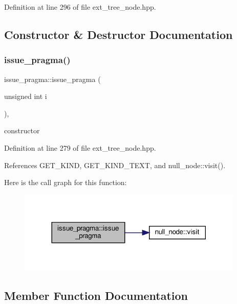 Definition at line 296 of file ext\+\_\+tree\+\_\+node.\+hpp.



\subsection{Constructor \& Destructor Documentation}
\mbox{\label{structissue__pragma_a2fb0bb710fcd096ca1b9e24b396932a1}} 
\subsubsection{\texorpdfstring{issue\+\_\+pragma()}{issue\_pragma()}}
{\footnotesize\ttfamily issue\+\_\+pragma\+::issue\+\_\+pragma (\begin{DoxyParamCaption}\item[{unsigned int}]{i }\end{DoxyParamCaption})\hspace{0.3cm}{\ttfamily [inline]}, {\ttfamily [explicit]}}



constructor 



Definition at line 279 of file ext\+\_\+tree\+\_\+node.\+hpp.



References G\+E\+T\+\_\+\+K\+I\+ND, G\+E\+T\+\_\+\+K\+I\+N\+D\+\_\+\+T\+E\+XT, and null\+\_\+node\+::visit().

Here is the call graph for this function\+:
\nopagebreak
\begin{figure}[H]
\begin{center}
\leavevmode
\includegraphics[width=305pt]{d1/d90/structissue__pragma_a2fb0bb710fcd096ca1b9e24b396932a1_cgraph}
\end{center}
\end{figure}


\subsection{Member Function Documentation}
\mbox{\label{structissue__pragma_afc993f822027243a8112c2b3f07bb17a}} 
